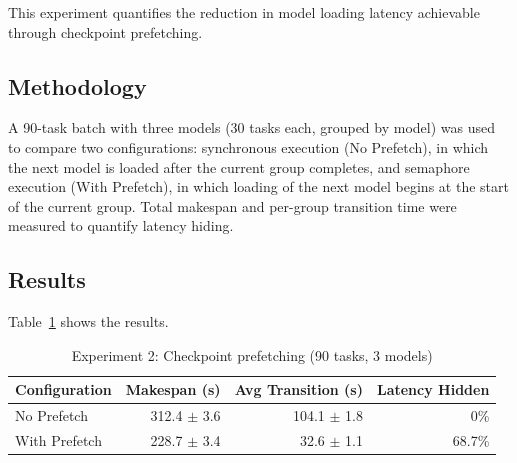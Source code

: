 \documentclass[logo,bsc,singlespacing,parskip,online]{infthesis}
\begin{document}
This experiment quantifies the reduction in model loading latency achievable through checkpoint prefetching.

\subsection{Methodology}

A 90-task batch with three models (30 tasks each, grouped by model) was used to compare two configurations: synchronous execution (No Prefetch), in which the next model is loaded after the current group completes, and semaphore execution (With Prefetch), in which loading of the next model begins at the start of the current group. Total makespan and per-group transition time were measured to quantify latency hiding.

\subsection{Results}

Table~\ref{tab:exp2_results} shows the results.

\begin{table}[htbp]
\centering
\caption{Experiment 2: Checkpoint prefetching (90 tasks, 3 models)}
\label{tab:exp2_results}
\begin{tabular}{lrrr}
\toprule
Configuration & Makespan (s) & Avg Transition (s) & Latency Hidden \\
\midrule
No Prefetch & 312.4 $\pm$ 3.6 & 104.1 $\pm$ 1.8 & 0\% \\
With Prefetch & 228.7 $\pm$ 3.4 & 32.6 $\pm$ 1.1 & 68.7\% \\
\bottomrule
\end{tabular}
\end{table}
\end{document}
